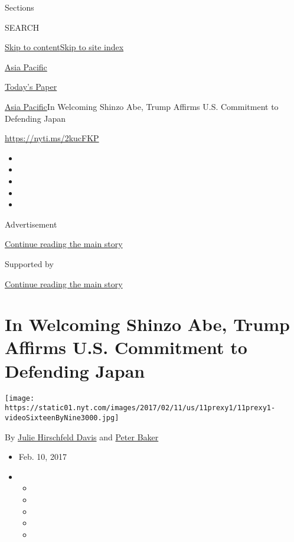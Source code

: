 Sections

SEARCH

\protect\hyperlink{site-content}{Skip to
content}\protect\hyperlink{site-index}{Skip to site index}

\href{https://www.nytimes.com/section/world/asia}{Asia Pacific}

\href{https://myaccount.nytimes.com/auth/login?response_type=cookie\&client_id=vi}{}

\href{https://www.nytimes.com/section/todayspaper}{Today's Paper}

\href{/section/world/asia}{Asia Pacific}\textbar{}In Welcoming Shinzo
Abe, Trump Affirms U.S. Commitment to Defending Japan

\url{https://nyti.ms/2kucFKP}

\begin{itemize}
\item
\item
\item
\item
\item
\end{itemize}

Advertisement

\protect\hyperlink{after-top}{Continue reading the main story}

Supported by

\protect\hyperlink{after-sponsor}{Continue reading the main story}

\hypertarget{in-welcoming-shinzo-abe-trump-affirms-us-commitment-to-defending-japan}{%
\section{In Welcoming Shinzo Abe, Trump Affirms U.S. Commitment to
Defending
Japan}\label{in-welcoming-shinzo-abe-trump-affirms-us-commitment-to-defending-japan}}

\texttt{[image: https://static01.nyt.com/images/2017/02/11/us/11prexy1/11prexy1-videoSixteenByNine3000.jpg]}

By \href{https://www.nytimes.com/by/julie-hirschfeld-davis}{Julie
Hirschfeld Davis} and \href{http://www.nytimes.com/by/peter-baker}{Peter
Baker}

\begin{itemize}
\item
  Feb. 10, 2017
\item
  \begin{itemize}
  \item
  \item
  \item
  \item
  \item
  \end{itemize}
\end{itemize}

